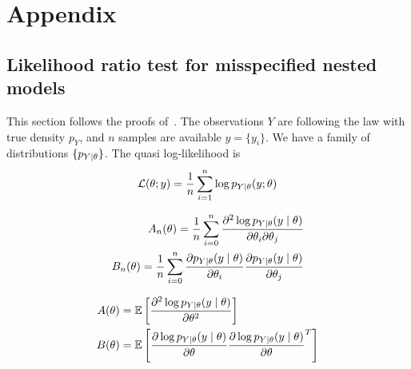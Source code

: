 \documentclass[../../Main_ManuscritThese.tex]{subfiles}
\begin{document}
%	


\begingroup

\appendix
\setcounter{chapter}{5}
\renewcommand{\thechapter}{A}
\TitleBtwLines
\chapter{Appendix}


\label{chap:appendix}
\pagestyle{appendixStyle}
\minitoc
\section{Likelihood ratio test for misspecified nested models}
This section follows the proofs of~\cite{white_maximum_1982}. The observations $Y$ are following the law
with true density $p_Y$, and $n$ samples are available $y=\{y_i\}$.
We have a family of distributions $\{p_{Y\mid \theta}\}$.  The quasi
log-likelihood is
  \begin{equation}
    \mathcal{L}(\theta; y) = \frac{1}{n}\sum_{i=1}^{n} \log p_{Y \mid \theta}(y;\theta)
  \end{equation}

  \begin{align}
    A_n(\theta) = \frac{1}{n} \sum_{i=0}^n \frac{\partial^2 \log p_{Y \mid \theta}(y\mid\theta)}{\partial \theta_i \partial \theta_j} \\
    B_n(\theta) = \frac{1}{n} \sum_{i=0}^n \frac{\partial p_{Y\mid \theta}(y \mid \theta)}{\partial \theta_i} \frac{\partial p_{Y\mid \theta}(y \mid \theta)}{\partial \theta_j}
  \end{align}

  \begin{align}
    A(\theta) &= \mathbb{E}\left[\frac{\partial^2 \log p_{Y\mid \theta}(y \mid \theta)}{\partial \theta^2}\right]\\
    B(\theta) &= \mathbb{E}\left[\frac{\partial \log p_{Y\mid \theta}(y \mid \theta)}{\partial \theta}\frac{\partial \log p_{Y\mid \theta}(y \mid \theta)}{\partial \theta}^T\right]
  \end{align}
\end{document}
